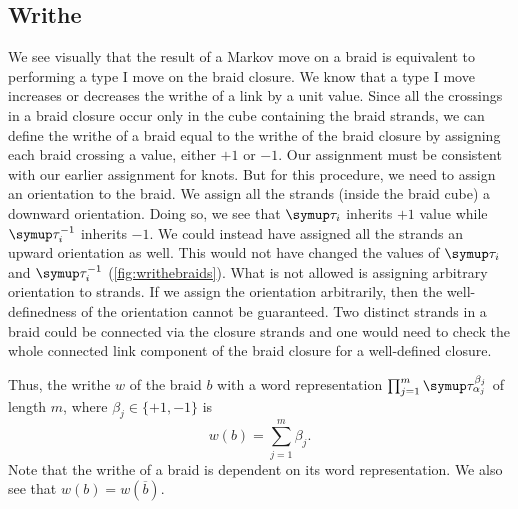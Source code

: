 \subsection{Writhe}

We see visually that the result of a Markov move on a braid is equivalent to performing a type I move on the braid closure. We know that a type I move increases or decreases the writhe of a link by a unit value. Since all the crossings in a braid closure occur only in the cube containing the braid strands, we can define the writhe of a braid equal to the writhe of the braid closure by assigning each braid crossing a value, either \(+1\) or \(-1\). Our assignment must be consistent with our earlier assignment for knots. But for this procedure, we need to assign an orientation to the braid. We assign all the strands (inside the braid cube) a downward orientation. Doing so, we see that \(\tauu_i\) inherits \(+1\) value while \(\tauu_i^{-1}\) inherits \(-1\). We could instead have assigned all the strands an upward orientation as well. This would not have changed the values of \(\tauu_i\) and \(\tauu_i^{-1}\) (\cref{fig:writhebraids}). What is not allowed is assigning arbitrary orientation to strands. If we assign the orientation arbitrarily, then the well-definedness of the orientation cannot be guaranteed. Two distinct strands in a braid could be connected via the closure strands and one would need to check the whole connected link component of the braid closure for a well-defined closure.

\noindent Thus, the writhe \(w\) of the braid \(b\) with a word representation \(\prod_{j=1}^{m} \tauu^{\beta_j}_{\alpha_j}\) of length \(m\), where \(\beta_j \in \{+1, -1\}\) is \[w(b) = \sum_{j = 1}^{m}\beta_j.\] Note that the writhe of a braid is dependent on its word representation. We also see that \(w(b) = w(\overline{b})\).

